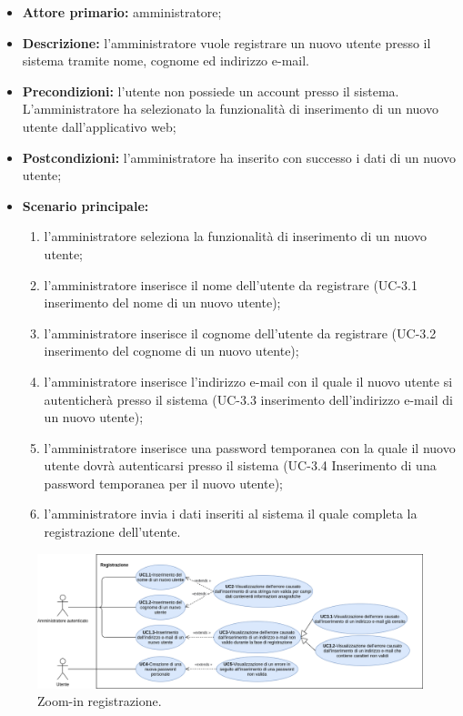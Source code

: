 \begin{itemize}
	\item \textbf{Attore primario:} amministratore;

	\item \textbf{Descrizione:} l'amministratore vuole registrare un nuovo utente presso il sistema tramite nome, cognome ed indirizzo e-mail.

	\item \textbf{Precondizioni:} l'utente non possiede un account presso il sistema. L'amministratore ha selezionato la funzionalità di inserimento di un nuovo utente dall'applicativo web;

	\item \textbf{Postcondizioni:} l'amministratore ha inserito con successo i dati di un nuovo utente;

	\item \textbf{Scenario principale:}
	      \begin{enumerate}
		      \item l'amministratore seleziona la funzionalità di inserimento di un nuovo utente;
		      \item l'amministratore inserisce il nome dell'utente da registrare (UC-3.1 inserimento del nome di un nuovo utente);
		      \item l'amministratore inserisce il cognome dell'utente da registrare (UC-3.2 inserimento del cognome di un nuovo utente);
		      \item l'amministratore inserisce l'indirizzo e-mail con il quale il nuovo utente si autenticherà presso il sistema (UC-3.3 inserimento dell'indirizzo e-mail di un nuovo utente);
		      \item l'amministratore inserisce una password temporanea con la quale il nuovo utente dovrà autenticarsi presso il sistema (UC-3.4 Inserimento di una password temporanea per il nuovo utente);
		      \item l'amministratore invia i dati inseriti al sistema il quale completa la registrazione dell'utente.
	\end{enumerate}
\end{itemize}


\begin{figure}[H]
	\centering
	  \includegraphics[width=\textwidth]{src/CasiDUso/immagini/SottocasiRegistrazione.png}
	\caption{Zoom-in registrazione.}
  \end{figure}

